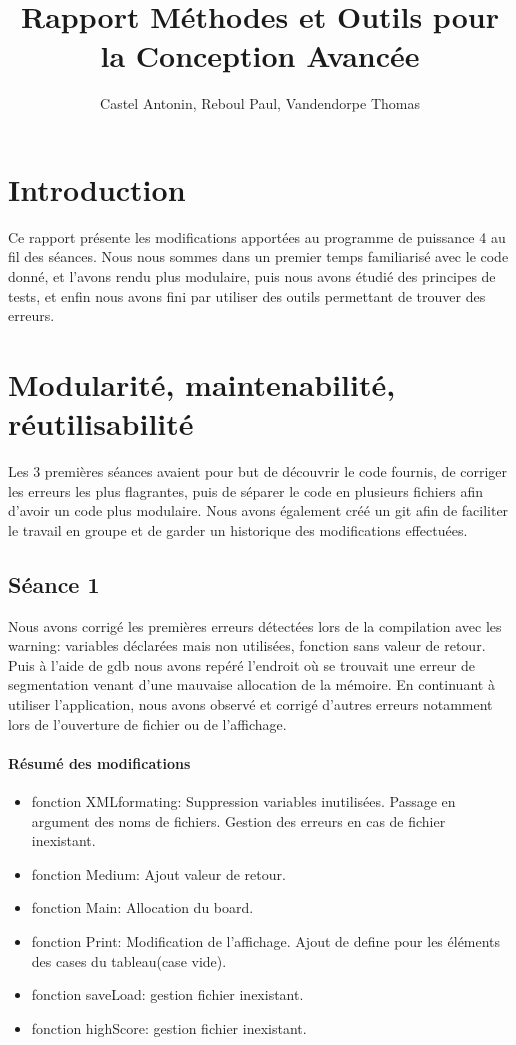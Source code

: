 \documentclass{article}
\title{Rapport Méthodes et Outils pour la Conception Avancée}
\author{Castel Antonin, Reboul Paul, Vandendorpe Thomas}
\begin{document}
\maketitle{}
\section{Introduction}

Ce rapport présente les modifications apportées au programme de puissance 4 au fil des séances. Nous nous sommes dans un premier temps familiarisé avec le code donné, et l'avons rendu plus modulaire, puis nous avons étudié des principes de tests, et enfin nous avons fini par utiliser des outils permettant de trouver des erreurs.

\section{Modularité, maintenabilité, réutilisabilité}

Les 3 premières séances avaient pour but de découvrir le code fournis, de corriger les erreurs les plus flagrantes, puis de séparer le code en plusieurs fichiers afin d'avoir un code plus modulaire. Nous avons également créé un git afin de faciliter le travail en groupe et de garder un historique des modifications effectuées.
\subsection{Séance 1}

Nous avons corrigé les premières erreurs détectées lors de la compilation avec les warning: variables déclarées mais non utilisées, fonction sans valeur de retour. Puis à l'aide de gdb nous avons repéré l'endroit où se trouvait une erreur de segmentation venant d'une mauvaise allocation de la mémoire. En continuant à utiliser l'application, nous avons observé et corrigé d'autres erreurs notamment lors de l'ouverture de fichier ou de l'affichage.

\paragraph{Résumé des modifications}
\begin{itemize}
\item fonction XMLformating: Suppression variables inutilisées. Passage en argument des noms de fichiers. Gestion des erreurs en cas de fichier inexistant.
\item fonction Medium: Ajout valeur de retour.
\item fonction Main: Allocation du board.
\item fonction Print: Modification de l'affichage. Ajout de define pour les éléments des cases du tableau(case vide).
\item fonction saveLoad: gestion fichier inexistant.
\item fonction highScore: gestion fichier inexistant.
\end{itemize}
\end{document}
